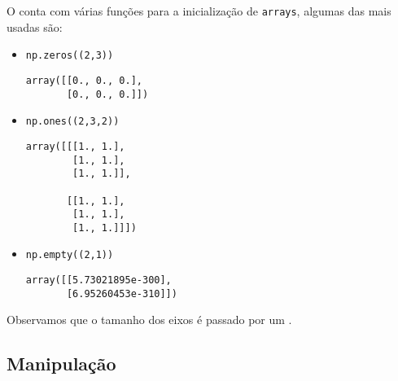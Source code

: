 O {\numpy} conta com várias funções para a inicialização de \texttt{arrays}, algumas das mais usadas são:
\begin{itemize}
\item {\PYTHONnumpyDOTzeros} 

\begin{lstlisting}[xrightmargin=2.5em]
np.zeros((2,3))
\end{lstlisting}

\begin{verbatim}
array([[0., 0., 0.],
       [0., 0., 0.]])
\end{verbatim}

\item {\PYTHONnumpyDOTones} 

\begin{lstlisting}[xrightmargin=2.5em]
np.ones((2,3,2))
\end{lstlisting}

\begin{verbatim}
array([[[1., 1.],
        [1., 1.],
        [1., 1.]],

       [[1., 1.],
        [1., 1.],
        [1., 1.]]])
\end{verbatim}

\item {\PYTHONnumpyDOTempty} 

\begin{lstlisting}[xrightmargin=2.5em]
np.empty((2,1))
\end{lstlisting}

\begin{verbatim}
array([[5.73021895e-300],
       [6.95260453e-310]])
\end{verbatim}

\end{itemize}
Observamos que o tamanho dos eixos é passado por um {\PYTHONtuple}.

\subsection{Manipulação}


